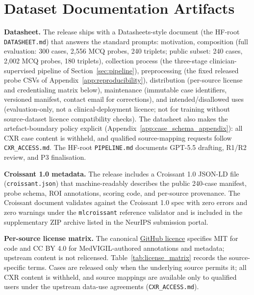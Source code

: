 \documentclass{article}
\begin{document}
\section{Dataset Documentation Artifacts}
\label{app:documentation}


\textbf{Datasheet.} The release ships with a Datasheets-style document \cite{gebru2021datasheets,pushkarna2022datacards} (the HF-root \texttt{DATASHEET.md}) that answers the standard prompts: motivation, composition (full evaluation: 300 cases, 2{,}556 MCQ probes, 240 triplets; public subset: 240 cases, 2{,}002 MCQ probes, 180 triplets), collection process (the three-stage clinician-supervised pipeline of Section~\ref{sec:pipeline}), preprocessing (the fixed released probe CSVs of Appendix~\ref{app:reproducibility}), distribution (per-source license and credentialing matrix below), maintenance (immutable case identifiers, versioned manifest, contact email for corrections), and intended/disallowed uses (evaluation-only, not a clinical-deployment licence; not for training without source-dataset licence compatibility checks). The datasheet also makes the artefact-boundary policy explicit (Appendix~\ref{app:case_schema_appendix}): all CXR case content is withheld, and qualified source-mapping requests follow \texttt{CXR\_ACCESS.md}. The HF-root \texttt{PIPELINE.md} documents GPT-5.5 drafting, R1/R2 review, and P3 finalisation.

\textbf{Croissant 1.0 metadata.} The release includes a Croissant 1.0 \cite{mlcommons2024croissant} JSON-LD file (\texttt{croissant.json}) that machine-readably describes the public 240-case manifest, probe schema, ROI annotations, scoring code, and per-source provenance. The Croissant document validates against the Croissant 1.0 spec with zero errors and zero warnings under the \texttt{mlcroissant} reference validator and is included in the supplementary ZIP archive listed in the NeurIPS submission portal.

\textbf{Per-source license matrix.} The canonical \href{https://github.com/hq0709/MedVIGIL/blob/main/LICENSE}{GitHub licence} specifies MIT for code and CC BY 4.0 for MedVIGIL-authored annotations and metadata; upstream content is not relicensed. Table~\ref{tab:license_matrix} records the source-specific terms. Cases are released only when the underlying source permits it; all CXR content is withheld, and source mappings are available only to qualified users under the upstream data-use agreements (\texttt{CXR\_ACCESS.md}).
\end{document}
